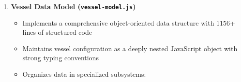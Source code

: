 \documentclass[
  letterpaper,
  DIV=11,
  numbers=noendperiod]{scrreprt}
\providecommand{\tightlist}{%
  \setlength{\itemsep}{0pt}\setlength{\parskip}{0pt}}\usepackage{longtable,booktabs,array}
\begin{document}
\begin{enumerate}
\begin{itemize}
    \begin{itemize}
    \tightlist
    \item
      OrbitControls for camera navigation (pan, rotate, zoom)
    \item
      TransformControls for direct manipulation (translate, rotate,
      scale)
    \item
      Raycaster-based object selection with visual feedback
    \end{itemize}
  \item
    Provides real-time synchronization between 3D objects and data model
    properties
  \item
    Implements custom visual feedback systems including:

    \begin{itemize}
    \tightlist
    \item
      Color-coded component highlighting for selection state
    \item
      Local axes visualization for component orientation
    \item
      Text sprite labeling for identification and measurements
    \item
      Dynamic material updates for selection and hover states
    \end{itemize}
  \item
    Optimizes rendering performance using:

    \begin{itemize}
    \tightlist
    \item
      Request animation frame with conditional rendering
    \item
      Efficient mesh creation with geometry instancing
    \item
      Adaptive resolution scaling based on device capabilities
    \item
      Conditional shadow casting based on object importance
    \end{itemize}
  \end{itemize}
\item
  \textbf{Vessel Data Model (\texttt{vessel-model.js})}

  \begin{itemize}
  \tightlist
  \item
    Implements a comprehensive object-oriented data structure with 1156+
    lines of structured code
  \item
    Maintains vessel configuration as a deeply nested JavaScript object
    with strong typing conventions
  \item
    Organizes data in specialized subsystems:


\end{itemize}
\end{enumerate}
\end{document}
